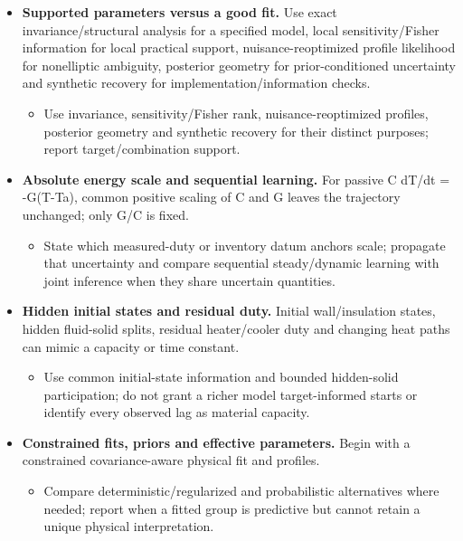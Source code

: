 \begin{itemize}[leftmargin=*]
\item {}\textbf{Supported parameters versus a good fit.} Use exact invariance/\allowbreak{}structural analysis for a specified model, local sensitivity/\allowbreak{}Fisher information for local practical support, nuisance-reoptimized profile likelihood for nonelliptic ambiguity, posterior geometry for prior-conditioned uncertainty and synthetic recovery for implementation/\allowbreak{}information checks.\cite{raue2009identifiability}
\begin{itemize}
\item Use invariance, sensitivity/\allowbreak{}Fisher rank, nuisance-reoptimized profiles, posterior geometry and synthetic recovery for their distinct purposes; report target/\allowbreak{}combination support.
\end{itemize}
\item {}\textbf{Absolute energy scale and sequential learning.} For passive C dT/\allowbreak{}dt = -G(T-Ta), common positive scaling of C and G leaves the trajectory unchanged; only G/\allowbreak{}C is fixed.
\begin{itemize}
\item State which measured-duty or inventory datum anchors scale; propagate that uncertainty and compare sequential steady/\allowbreak{}dynamic learning with joint inference when they share uncertain quantities.
\end{itemize}
\item {}\textbf{Hidden initial states and residual duty.} Initial wall/\allowbreak{}insulation states, hidden fluid-solid splits, residual heater/\allowbreak{}cooler duty and changing heat paths can mimic a capacity or time constant.
\begin{itemize}
\item Use common initial-state information and bounded hidden-solid participation; do not grant a richer model target-informed starts or identify every observed lag as material capacity.
\end{itemize}
\item {}\textbf{Constrained fits, priors and effective parameters.} Begin with a constrained covariance-aware physical fit and profiles.\cite{kristensen2004greybox}
\begin{itemize}
\item Compare deterministic/\allowbreak{}regularized and probabilistic alternatives where needed; report when a fitted group is predictive but cannot retain a unique physical interpretation.
\end{itemize}
\end{itemize}

